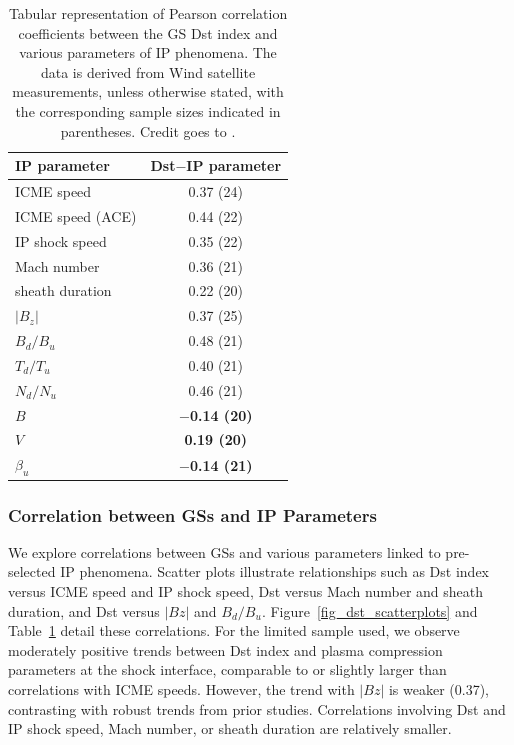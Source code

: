 \begin{table}[!htp] 
	\small
	\centering
	\caption{Tabular representation of Pearson correlation coefficients between the GS Dst index and various parameters of IP phenomena. The data is derived from Wind satellite measurements, unless otherwise stated, with the corresponding sample sizes indicated in parentheses. Credit goes to \citet{miteva_2023}.}
	\label{tab_cc_IP}
	\begin{tabular}{lc}
		\toprule
		\textbf{IP parameter} & \textbf{Dst$-$IP parameter} \\
		\midrule
		ICME speed  & 0.37 (24)	\\
		ICME speed (ACE)   & 0.44 (22)	\\
		IP shock speed  & 0.35 (22)	\\
		Mach number  & 0.36 (21)	\\ 
		sheath duration & 0.22 (20) \\
		$|B_z|$      & 0.37 (25) \\
		$B_d/B_u$  & 0.48 (21)	\\
		$T_d/T_u$  & 0.40 (21)	\\
		$N_d/N_u$  & 0.46 (21)	\\
		{\bf $B$}  & {\bf $-$0.14 (20)}  \\
		{\bf $V$}       & {\bf 0.19 (20)}	\\
		{\bf $\beta_u$} & {\bf $-$0.14 (21)}	\\
		\bottomrule
	\end{tabular}
\end{table}

\subsubsection{Correlation between GSs and IP Parameters}
We explore correlations between GSs and various parameters linked to pre-selected IP phenomena. Scatter plots illustrate relationships such as Dst index versus ICME speed and IP shock speed, Dst versus Mach number and sheath duration, and Dst versus $|Bz|$ and $B_d/B_u$. Figure~\ref{fig_dst_scatterplots} and Table~\ref{tab_cc_IP} detail these correlations.
For the limited sample used, we observe moderately positive trends between Dst index and plasma compression parameters at the shock interface, comparable to or slightly larger than correlations with ICME speeds. However, the trend with $|Bz|$ is weaker (0.37), contrasting with robust trends from prior studies. Correlations involving Dst and IP shock speed, Mach number, or sheath duration are relatively smaller.

